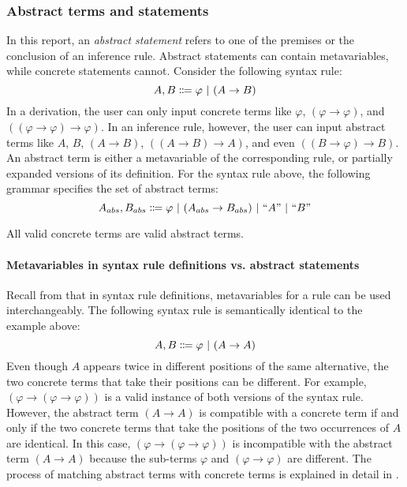 \subsubsection{Abstract terms and statements}
In this report, an \textit{abstract statement} refers to one of the premises or the conclusion of an inference rule. Abstract statements can contain metavariables, while concrete statements cannot. Consider the following syntax rule:
\[
    A, B \Coloneqq \varphi \ |\  (A \to B)
\]
In a derivation, the user can only input concrete terms like $\varphi$, $(\varphi \to \varphi)$, and $((\varphi \to \varphi) \to \varphi)$. In an inference rule, however, the user can input abstract terms like $A$, $B$, $(A \to B)$, $((A \to B) \to A)$, and even $((B \to \varphi) \to B)$. An abstract term is either a metavariable of the corresponding rule, or partially expanded versions of its definition. For the syntax rule above, the following grammar specifies the set of abstract terms:
\[
    A_{abs}, B_{abs} \Coloneqq \varphi \ |\  (A_{abs} \to B_{abs}) \ |\  \text{``$A$''} \ |\  \text{``$B$''}
\]

All valid concrete terms are valid abstract terms.

\paragraph{Metavariables in syntax rule definitions vs. abstract statements}
Recall from  that in syntax rule definitions, metavariables for a rule can be used interchangeably. The following syntax rule is semantically identical to the example above:
\[
    A, B \Coloneqq \varphi \ |\  (A \to A)
\]
Even though $A$ appears twice in different positions of the same alternative, the two concrete terms that take their positions can be different. For example, $(\varphi \to (\varphi \to \varphi))$ is a valid instance of both versions of the syntax rule. However, the abstract term $(A \to A)$ is compatible with a concrete term if and only if the two concrete terms that take the positions of the two occurrences of $A$ are identical. In this case, $(\varphi \to (\varphi \to \varphi))$ is incompatible with the abstract term $(A \to A)$ because the sub-terms $\varphi$ and $(\varphi \to \varphi)$ are different. The process of matching abstract terms with concrete terms is explained in detail in .

